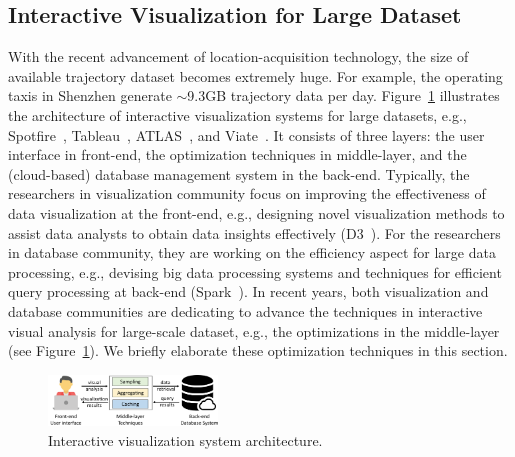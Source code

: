 \subsection{Interactive Visualization for Large Dataset}\label{sec:interactive}
{With the recent advancement of location-acquisition technology, the size of available trajectory dataset becomes extremely huge.}
For example, the operating taxis in Shenzhen generate {$\sim$}9.3GB trajectory data per day.
Figure~\ref{fig:framework} illustrates the architecture of interactive visualization systems for large datasets,
e.g., Spotfire~\cite{Spotfire}, Tableau~\cite{Tableau}, ATLAS~\cite{chan2008maintaining}, and Viate~\cite{yang2019vaite}.
{It} consists of three layers: the user interface in front-end, the optimization techniques in middle-layer, and the (cloud-based) database management system in the back-end.
{Typically, the researchers in visualization community focus on improving the effectiveness of data visualization at the front-end,
e.g., designing novel visualization methods to assist data analysts to obtain data insights effectively (D3~\cite{d3}).}
For the researchers in database community, they are working on the efficiency aspect for large data processing,
e.g., devising big data processing systems and techniques for efficient query processing at back-end (Spark~\cite{spark}).
In recent years, both visualization and database communities are dedicating to advance the techniques in interactive visual analysis for large-scale dataset,
e.g., the optimizations in the middle-layer (see Figure~\ref{fig:framework}).
We briefly elaborate these optimization techniques {in this section}. %


\begin{figure}
	\centering
	\includegraphics[width=0.40\textwidth]{pictures/framework/framework.pdf}
	\vspace{-3mm}
	\caption{Interactive visualization system architecture.} \label{fig:framework}
    \vspace{-6mm}
\end{figure}


